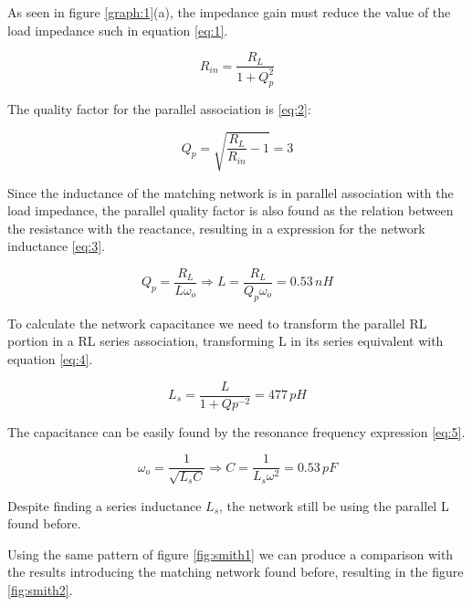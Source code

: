 

As seen in figure \ref{graph:1}(a), the impedance gain must reduce the value of the load impedance such in equation \ref{eq:1}.

\begin{equation} \label{eq:1}
    R_{in} = \frac{R_L}{1+Q_p^2}
\end{equation}

The quality factor for the parallel association is \ref{eq:2}:

\begin{equation} \label{eq:2}
    Q_p = \sqrt{\frac{R_L}{R_{in}}-1} = 3
\end{equation}

Since the inductance of the matching network is in parallel association with the load impedance, the parallel quality factor is also found as the relation between the resistance with the reactance, resulting in a expression for the network inductance \ref{eq:3}.

\begin{equation} \label{eq:3}
    Q_p = \frac{R_L}{L\omega_o} \Longrightarrow L = \frac{R_L}{Q_p\omega_o} = 0.53 \, nH
\end{equation}

To calculate the network capacitance we need to transform the parallel RL portion in a RL series association, transforming L in its series equivalent with equation \ref{eq:4}.

\begin{equation} \label{eq:4}
    L_s = \frac{L}{1+Qp^{-2}} = 477 \, pH
\end{equation}

The capacitance can be easily found by the resonance frequency expression \ref{eq:5}.

\begin{equation} \label{eq:5}
    \omega_o = \frac{1}{\sqrt{L_sC}} \Longrightarrow C = \frac{1}{L_s \omega^2} = 0.53 \, pF
\end{equation}

Despite finding a series inductance $L_s$, the network still be using the parallel L found before.

Using the same pattern of figure \ref{fig:smith1} we can produce a comparison with the results introducing the matching network found before, resulting in the figure \ref{fig:smith2}.

